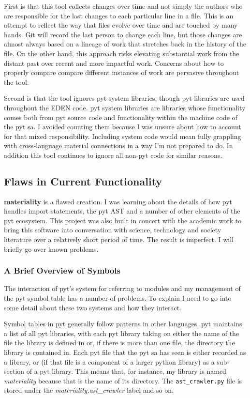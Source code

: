 \documentclass[a4paper,man,natbib,floatsintext]{apa6}
\begin{document}
  First is that this tool collects changes over time and not simply the authors who are responsible for the last changes to each particular line in a file. This is an attempt to reflect the way that files evolve over time and are touched by many hands. Git will record the last person to change each line, but those changes are almost always based on a lineage of work that stretches back in the history of the file. On the other hand, this approach risks elevating substantial work from the distant past over recent and more impactful work. Concerns about how to properly compare compare different instances of work are pervasive throughout the tool.

  Second is that the tool ignores \Gls{pyt} system libraries, though \Gls{pyt} libraries are used throughout the \gls{EDEN} code. \Gls{pyt} system libraries are libraries whose functionality comes both from \Gls{pyt} source code and functionality within the machine code of the \Gls{pyt} \gls{sa}. I avoided counting them because I was unsure about how to account for that mixed responsibility. Including system code would mean fully grappling with cross-language material connections in a way I'm not prepared to do. In addition this tool continues to ignore all non-\Gls{pyt} code for similar reasons.

  \subsection{Flaws in Current Functionality}
  \textbf{materiality} is a flawed creation. I was learning about the details of how \Gls{pyt} handles import statements, the \Gls{pyt} AST and a number of other elements of the \Gls{pyt} ecosystem. This project was also built in concert with the academic work to bring this software into conversation with science, technology and society literature over a relatively short period of time. The result is imperfect. I will briefly go over known problems.

  \subsubsection{A Brief Overview of Symbols}
  The interaction of \Gls{pyt}'s system for referring to modules and my management of the \Gls{pyt} symbol table has a number of problems. To explain I need to go into some detail about these two systems and how they interact.

  Symbol tables in \Gls{pyt} generally follow patterns in other languages. \Gls{pyt} maintains a list of all \Gls{pyt} libraries, with each \Gls{pyt} library taking on either the name of the file the library is defined in or, if there is more than one file, the directory the library is contained in. Each \Gls{pyt} file that the \Gls{pyt} \gls{sa} has seen is either recorded as a library, or (if that file is a component of a larger python library) as a sub-section of a \Gls{pyt} library. This means that, for instance, my library is named \textit{materiality} because that is the name of its directory. The \verb|ast_crawler.py| file is stored under the \textit{materiality.ast\_crawler} label and so on.
\end{document}
